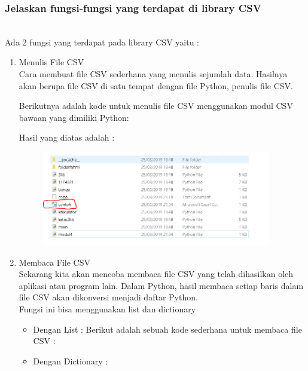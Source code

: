 \subsubsection{Jelaskan fungsi-fungsi yang terdapat di library CSV}\\
Ada 2 fungsi yang terdapat pada library CSV yaitu :
\begin{enumerate} 
	\item Menulis File CSV \\
	Cara membuat file CSV sederhana yang menulis sejumlah data. Hasilnya akan berupa file CSV di satu tempat dengan file Python, penulis file CSV.
	
	Berikutnya adalah kode untuk menulis file CSV menggunakan modul CSV bawaan yang dimiliki Python:
	
	
	
	Hasil yang diatas adalah : 
	\begin{figure}[H]
		\includegraphics[width=10cm]{figures/fahmi/8.png}
		\centering
	\end{figure}
	
	\item Membaca File CSV \\
	Sekarang kita akan mencoba membaca file CSV yang telah dihasilkan oleh aplikasi atau program lain. Dalam Python, hasil membaca setiap baris dalam file CSV akan dikonversi menjadi daftar Python. \\
	
	Fungsi ini bisa menggunakan list dan dictionary
	
	\begin{itemize}
		\item Dengan List :
		Berikut adalah sebuah kode sederhana untuk membaca file CSV :
		
		
		\item Dengan Dictionary : 
		
		
	\end{itemize}
	
\end{enumerate}



